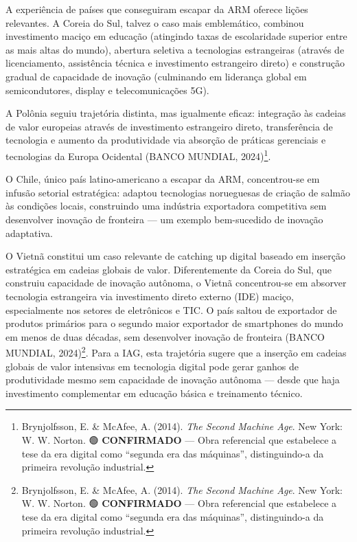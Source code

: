 \documentclass[
  brazilian,
  12pt,
]{article}
\begin{document}
A experiência de países que conseguiram escapar da ARM oferece lições relevantes. A Coreia do Sul, talvez o caso mais emblemático, combinou investimento maciço em educação (atingindo taxas de escolaridade superior entre as mais altas do mundo), abertura seletiva a tecnologias estrangeiras (através de licenciamento, assistência técnica e investimento estrangeiro direto) e construção gradual de capacidade de inovação (culminando em liderança global em semicondutores, display e telecomunicações 5G).

A Polônia seguiu trajetória distinta, mas igualmente eficaz: integração às cadeias de valor europeias através de investimento estrangeiro direto, transferência de tecnologia e aumento da produtividade via absorção de práticas gerenciais e tecnologias da Europa Ocidental (BANCO MUNDIAL, 2024)\footnote{Brynjolfsson, E. \& McAfee, A. (2014). \emph{The Second Machine Age}. New York: W. W. Norton. 🟢 \textbf{CONFIRMADO} --- Obra referencial que estabelece a tese da era digital como ``segunda era das máquinas'', distinguindo-a da primeira revolução industrial.}.

O Chile, único país latino-americano a escapar da ARM, concentrou-se em infusão setorial estratégica: adaptou tecnologias norueguesas de criação de salmão às condições locais, construindo uma indústria exportadora competitiva sem desenvolver inovação de fronteira --- um exemplo bem-sucedido de inovação adaptativa.

O Vietnã constitui um caso relevante de catching up digital baseado em inserção estratégica em cadeias globais de valor. Diferentemente da Coreia do Sul, que construiu capacidade de inovação autônoma, o Vietnã concentrou-se em absorver tecnologia estrangeira via investimento direto externo (IDE) maciço, especialmente nos setores de eletrônicos e TIC. O país saltou de exportador de produtos primários para o segundo maior exportador de smartphones do mundo em menos de duas décadas, sem desenvolver inovação de fronteira (BANCO MUNDIAL, 2024)\footnote{Brynjolfsson, E. \& McAfee, A. (2014). \emph{The Second Machine Age}. New York: W. W. Norton. 🟢 \textbf{CONFIRMADO} --- Obra referencial que estabelece a tese da era digital como ``segunda era das máquinas'', distinguindo-a da primeira revolução industrial.}. Para a IAG, esta trajetória sugere que a inserção em cadeias globais de valor intensivas em tecnologia digital pode gerar ganhos de produtividade mesmo sem capacidade de inovação autônoma --- desde que haja investimento complementar em educação básica e treinamento técnico.
\end{document}
